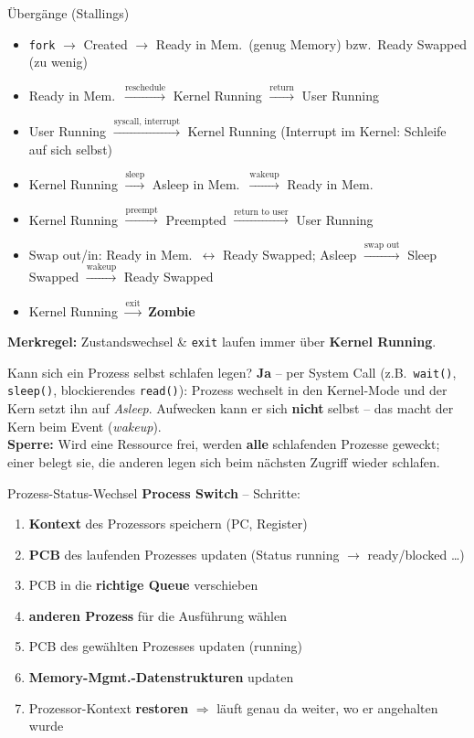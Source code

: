 \documentclass[a4paper, fontsize=7pt]{scrartcl}
\begin{document}
\begin{mainbox}{Übergänge (Stallings)}
\begin{itemize}
    \item \texttt{fork} $\to$ Created $\to$ Ready in Mem.\ (genug Memory)
          bzw.\ Ready Swapped (zu wenig)
    \item Ready in Mem.\ $\xrightarrow{\text{reschedule}}$ Kernel Running
          $\xrightarrow{\text{return}}$ User Running
    \item User Running $\xrightarrow{\text{syscall, interrupt}}$ Kernel
          Running (Interrupt im Kernel: Schleife auf sich selbst)
    \item Kernel Running $\xrightarrow{\text{sleep}}$ Asleep in Mem.\
          $\xrightarrow{\text{wakeup}}$ Ready in Mem.
    \item Kernel Running $\xrightarrow{\text{preempt}}$ Preempted
          $\xrightarrow{\text{return to user}}$ User Running
    \item Swap out/in: Ready in Mem.\ $\leftrightarrow$ Ready Swapped;
          Asleep $\xrightarrow{\text{swap out}}$ Sleep Swapped
          $\xrightarrow{\text{wakeup}}$ Ready Swapped
    \item Kernel Running $\xrightarrow{\text{exit}}$ \textbf{Zombie}
\end{itemize}
\textbf{Merkregel:} Zustandswechsel \& \texttt{exit} laufen immer über
\textbf{Kernel Running}.
\end{mainbox}

\begin{subbox}{Kann sich ein Prozess selbst schlafen legen?}
\textbf{Ja} -- per System Call (z.B.\ \texttt{wait()}, \texttt{sleep()},
blockierendes \texttt{read()}): Prozess wechselt in den Kernel-Mode und der
Kern setzt ihn auf \emph{Asleep}. Aufwecken kann er sich \textbf{nicht}
selbst -- das macht der Kern beim Event (\emph{wakeup}).\\
\textbf{Sperre:} Wird eine Ressource frei, werden \textbf{alle}
schlafenden Prozesse geweckt; einer belegt sie, die anderen legen sich
beim nächsten Zugriff wieder schlafen.
\end{subbox}

\begin{mainbox}{Prozess-Status-Wechsel}
\textbf{Process Switch} -- Schritte:
\begin{enumerate}
    \item \textbf{Kontext} des Prozessors speichern (PC, Register)
    \item \textbf{PCB} des laufenden Prozesses updaten (Status
          running $\to$ ready/blocked \ldots)
    \item PCB in die \textbf{richtige Queue} verschieben
    \item \textbf{anderen Prozess} für die Ausführung wählen
    \item PCB des gewählten Prozesses updaten (running)
    \item \textbf{Memory-Mgmt.-Datenstrukturen} updaten
    \item Prozessor-Kontext \textbf{restoren} $\Rightarrow$ läuft genau da
          weiter, wo er angehalten wurde
\end{enumerate}
\end{mainbox}
\end{document}
